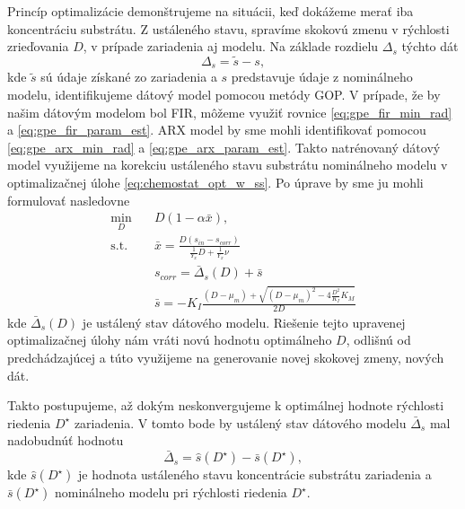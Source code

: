 Princíp optimalizácie demonštrujeme na situácii, keď dokážeme merať iba koncentráciu substrátu. Z ustáleného stavu, spravíme skokovú zmenu v rýchlosti zrieďovania $ D $, v prípade zariadenia aj modelu. Na základe rozdielu $ \Delta_{s} $ týchto dát
\begin{equation}
	\Delta_{s} = \tilde{s} - s,
\end{equation}
kde $ \tilde{s} $ sú údaje získané zo zariadenia a $ s $ predstavuje údaje z nominálneho modelu, identifikujeme dátový model pomocou metódy GOP. V prípade, že by našim dátovým modelom bol FIR, môžeme využiť rovnice \eqref{eq:gpe_fir_min_rad} a \eqref{eq:gpe_fir_param_est}. ARX model by sme mohli identifikovať pomocou \eqref{eq:gpe_arx_min_rad} a \eqref{eq:gpe_arx_param_est}. Takto natrénovaný dátový model využijeme na korekciu ustáleného stavu substrátu nominálneho modelu v optimalizačnej úlohe \eqref{eq:chemostat_opt_w_ss}. Po úprave by sme ju mohli formulovať nasledovne
\begin{equation}
\label{eq:hybrid_opt_subs}
	\begin{split}
		\min_{D} &\quad D\left(1-\alpha\bar{x}\right), \\
		\text{s.t.} &\quad \bar{x} = \frac{D\left(s_{in}-s_{corr}\right)}{\frac{1}{Y_{x}}D + \frac{1}{Y_{x}}\nu} \\
		&\quad s_{corr} = \bar{\Delta}_{s}(D) + \bar{s}\\
		&\quad \bar{s} = -K_{I}\frac{\left(D-\mu_{m}\right) + \sqrt{\left(D-\mu_{m}\right)^2 - 4\frac{D^2}{K_{I}}K_{M}}}{2D}
	\end{split}
\end{equation}
kde $ \bar{\Delta}_{s}(D) $ je ustálený stav dátového modelu. Riešenie tejto upravenej optimalizačnej úlohy nám vráti novú hodnotu optimálneho $ D $, odlišnú od predchádzajúcej a túto využijeme na generovanie novej skokovej zmeny, nových dát. 

Takto postupujeme, až dokým neskonvergujeme k optimálnej hodnote rýchlosti riedenia $ D^{\star} $ zariadenia. V tomto bode by ustálený stav dátového modelu $ \bar{\Delta}_s $ mal nadobudnúť hodnotu
\begin{equation}
	\bar{\Delta}_s = \hat{s}\left(D^{\star}\right) - \bar{s}\left(D^{\star}\right),
\end{equation} 
kde $ \hat{s}\left(D^{\star}\right) $ je hodnota ustáleného stavu koncentrácie substrátu zariadenia a $ \bar{s}\left(D^{\star}\right) $ nominálneho modelu pri rýchlosti riedenia $ D^{\star} $.

